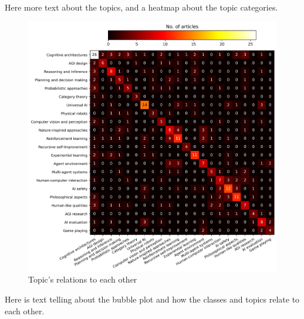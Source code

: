 \documentclass[utf8,english]{gradu3}
\begin{document}
Here more text about the topics, and a heatmap about the topic categories.

\begin{figure}[H]
  \centering
  \includegraphics[scale=0.65]{material/data/topic_heatmap.png}
  \caption{Topic's relations to each other}
  \label{fig:topicheat}
\end{figure}



Here is text telling about the bubble plot and how the classes and topics relate
to each other.
\end{document}
